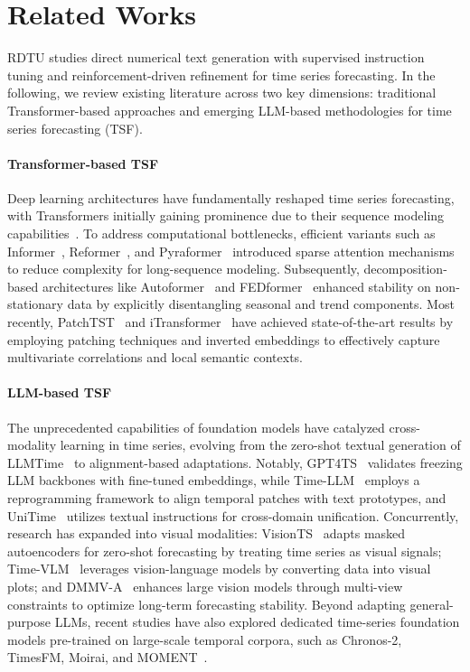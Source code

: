 \section{Related Works}

RDTU studies direct numerical text generation with supervised instruction tuning and reinforcement-driven refinement for time series forecasting. In the following, we review existing literature across two key dimensions: traditional Transformer-based approaches and emerging LLM-based methodologies for time series forecasting (TSF).


\paragraph{Transformer-based TSF}
Deep learning architectures have fundamentally reshaped time series forecasting, with Transformers initially gaining prominence due to their sequence modeling capabilities~\citep{wen2022transformers}. To address computational bottlenecks, efficient variants such as Informer~\citep{zhou2021informer}, Reformer~\citep{kitaev2020reformer}, and Pyraformer~\citep{liu2022pyraformer} introduced sparse attention mechanisms to reduce complexity for long-sequence modeling. Subsequently, decomposition-based architectures like Autoformer~\citep{wu2021autoformer} and FEDformer~\citep{zhou2022fedformer} enhanced stability on non-stationary data by explicitly disentangling seasonal and trend components. Most recently, PatchTST~\citep{nie2022time} and iTransformer~\citep{liu2023itransformer} have achieved state-of-the-art results by employing patching techniques and inverted embeddings to effectively capture multivariate correlations and local semantic contexts.


\paragraph{LLM-based TSF}

The unprecedented capabilities of foundation models have catalyzed cross-modality learning in time series, evolving from the zero-shot textual generation of LLMTime~\citep{gruver2023llmtime} to alignment-based adaptations. Notably, GPT4TS~\citep{zhou2023one} validates freezing LLM backbones with fine-tuned embeddings, while Time-LLM~\citep{jin2024timellm} employs a reprogramming framework to align temporal patches with text prototypes, and UniTime~\citep{liu2024unitime} utilizes textual instructions for cross-domain unification. Concurrently, research has expanded into visual modalities: VisionTS~\citep{chen2024visionts} adapts masked autoencoders for zero-shot forecasting by treating time series as visual signals; Time-VLM~\citep{zhong2025time} leverages vision-language models by converting data into visual plots; and DMMV-A~\citep{shen2025dmmv} enhances large vision models through multi-view constraints to optimize long-term forecasting stability. Beyond adapting general-purpose LLMs, recent studies have also explored dedicated time-series foundation models pre-trained on large-scale temporal corpora, such as Chronos-2, TimesFM, Moirai, and MOMENT~\citep{ansari2025chronos2,das2024decoder,woo2024unified,goswami2024moment}.

